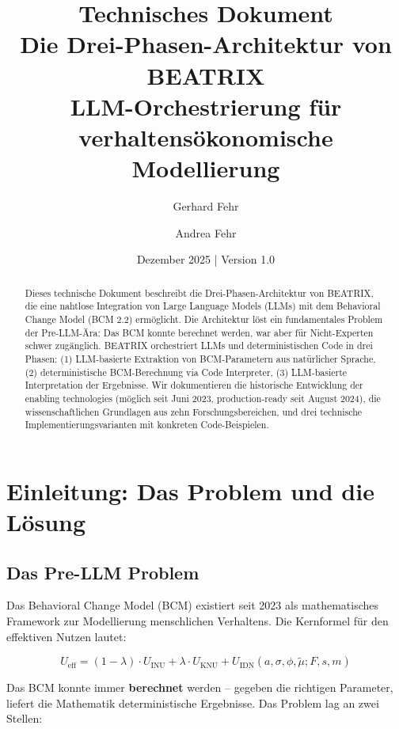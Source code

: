 \documentclass[12pt,a4paper]{article}
\title{
{\LARGE\bfseries Technisches Dokument}\\[0.4cm]
{\Large Die Drei-Phasen-Architektur von BEATRIX}\\[0.2cm]
{\large LLM-Orchestrierung für verhaltensökonomische Modellierung}
}
\author[1]{Gerhard Fehr}
\author[1]{Andrea Fehr}
\affil[1]{FehrAdvice \& Partners AG, Zürich}
\date{Dezember 2025 | Version 1.0}
\begin{document}
\maketitle

\begin{abstract}
Dieses technische Dokument beschreibt die Drei-Phasen-Architektur von BEATRIX, die eine nahtlose Integration von Large Language Models (LLMs) mit dem Behavioral Change Model (BCM 2.2) ermöglicht.
Die Architektur löst ein fundamentales Problem der Pre-LLM-Ära: Das BCM konnte berechnet werden, war aber für Nicht-Experten schwer zugänglich.
BEATRIX orchestriert LLMs und deterministischen Code in drei Phasen: (1) LLM-basierte Extraktion von BCM-Parametern aus natürlicher Sprache, (2) deterministische BCM-Berechnung via Code Interpreter, (3) LLM-basierte Interpretation der Ergebnisse.
Wir dokumentieren die historische Entwicklung der enabling technologies (möglich seit Juni 2023, production-ready seit August 2024), die wissenschaftlichen Grundlagen aus zehn Forschungsbereichen, und drei technische Implementierungsvarianten mit konkreten Code-Beispielen.
\end{abstract}

\tableofcontents
\newpage

\section{Einleitung: Das Problem und die Lösung}

\subsection{Das Pre-LLM Problem}

Das Behavioral Change Model (BCM) existiert seit 2023 als mathematisches Framework zur Modellierung menschlichen Verhaltens.
Die Kernformel für den effektiven Nutzen lautet:

\begin{equation}
U_{\text{eff}} = (1-\lambda) \cdot U_{\text{INU}} + \lambda \cdot U_{\text{KNU}} + U_{\text{IDN}}(a, \sigma, \phi, \tilde{\mu}; F, s, m)
\end{equation}

Das BCM konnte immer \textbf{berechnet} werden -- gegeben die richtigen Parameter, liefert die Mathematik deterministische Ergebnisse.
Das Problem lag an zwei Stellen:
\end{document}
